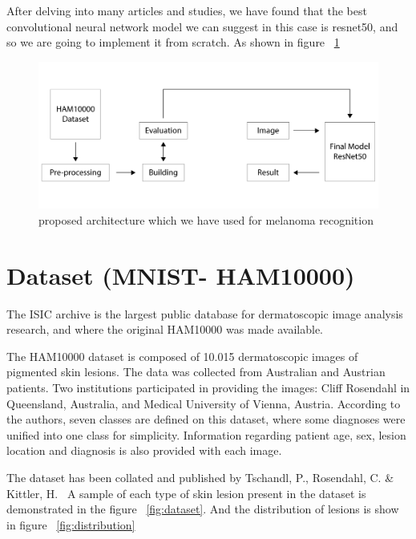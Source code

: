     After delving into many articles and studies, we have found that the best convolutional neural network model we can suggest in this case is resnet50, and so we are going to implement it from scratch. As shown in figure ~\ref{fig:architecture}

    \begin{figure}[htbp]
    \begin{center}
    \includegraphics[width=15cm]{./chapter-05-our-contribution/3.png}
    \end{center}
    \caption{proposed architecture which we have used for melanoma recognition}
    \label{fig:architecture}
    \end{figure}

\section{Dataset (MNIST- HAM10000)}

    The ISIC archive is the largest public database for dermatoscopic image analysis research, and where the original HAM10000 was made available.~\cite{JULIANA2021}

    The HAM10000 dataset is composed of 10.015 dermatoscopic images of pigmented skin lesions. The data was collected from Australian and Austrian patients. Two institutions participated in providing the images: Cliff Rosendahl in Queensland, Australia, and Medical University of Vienna, Austria. According to the authors, seven classes are defined on this dataset, where some diagnoses were unified into one class for simplicity. Information regarding patient age, sex, lesion location and diagnosis is also provided with each image. ~\cite{JULIANA2021}


    The dataset has been collated and published by Tschandl, P., Rosendahl, C. \& Kittler, H.~\cite{JULIANA2021} A sample of each type of skin lesion present in the dataset is demonstrated in the figure ~\ref{fig:dataset}. And the distribution of lesions is show in figure ~\ref{fig:distribution}

